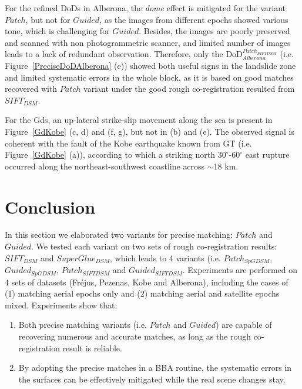 For the refined \ac{DoD}s in Alberona, the \textit{dome} effect is mitigated for the variant $Patch$, but not for $Guided$, as the images from different epochs showed various tone, which is challenging for $Guided$. Besides, the images are poorly preserved and scanned with non photogrammetric scanner, and limited number of images leads to a lack of redundant observation. Therefore, only the \ac{DoD}$_{Alberona}^{Patch_{SIFTDSM}}$ (i.e. Figure~\ref{PreciseDoDAlberona} (e)) showed both useful signs in the landslide zone and limited systematic errors in the whole block, as it is based on good matches recovered with $Patch$ variant under the good rough co-registration resulted from $SIFT_{DSM}$.\\
\par
For the Gds, an up-lateral strike-slip movement along the sea is present in Figure~\ref{GdKobe} (c, d) and (f, g), but not in (b) and (e). The observed signal is coherent with the fault of the Kobe earthquake known from \ac{GT} (i.e. Figure~\ref{GdKobe} (a)), according to which a striking north $30^{\circ}$-$60^{\circ}$ east rupture occurred along the northeast-southwest coastline across $ \sim $18 km.\\


\section{Conclusion}
In this section we elaborated two variants for precise matching: $Patch$ and $Guided$. 
We tested each variant on two sets of rough co-registration results: $SIFT_{DSM}$ and $SuperGlue_{DSM}$, which leads to 4 variants (i.e.  $Patch_{SpGDSM}$,  $Guided_{SpGDSM}$,  $Patch_{SIFTDSM}$ and  $Guided_{SIFTDSM}$.
Experiments are performed on 4 sets of datasets (Fr{\'e}jus, Pezenas, Kobe and Alberona), including the cases of (1) matching aerial epochs only and (2) matching aerial and satellite epochs mixed.
Experiments show that:\\
\begin{enumerate}
	\item Both precise matching variants (i.e. $Patch$ and $Guided$) are capable of recovering numerous and accurate matches, as long as the rough co-registration result is reliable.\\
	\item By adopting the precise matches in a \ac{BBA} routine, the systematic errors in the surfaces can be effectively mitigated while the real scene changes stay.
\end{enumerate}


